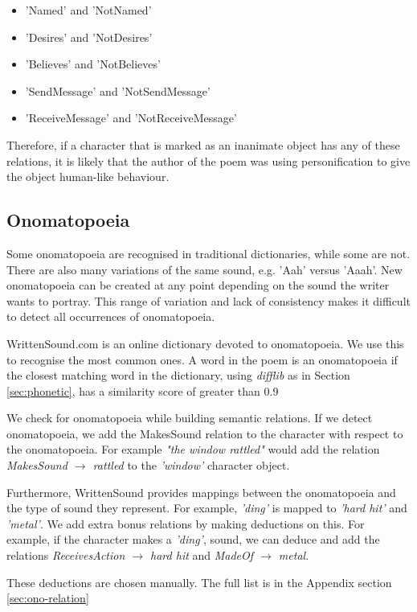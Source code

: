 \begin{itemize}
\item{'Named' and 'NotNamed'}
\item{'Desires' and 'NotDesires'}
\item{'Believes' and 'NotBelieves'}
\item{'SendMessage' and 'NotSendMessage'}
\item{'ReceiveMessage' and 'NotReceiveMessage'}
\end{itemize}

Therefore, if a character that is marked as an inanimate object has any of these relations, it is likely that the author of the poem was using personification to give the object human-like behaviour.


\subsection{Onomatopoeia}
\label{sec:ono}
Some onomatopoeia are recognised in traditional dictionaries, while some are not. There are also many variations of the same sound, e.g. 'Aah' versus 'Aaah'. New onomatopoeia can be created at any point depending on the sound the writer wants to portray. This range of variation and lack of consistency makes it difficult to detect all occurrences of onomatopoeia.

WrittenSound.com is an online dictionary devoted to onomatopoeia. We use this to recognise the most common ones. A word in the poem is an onomatopoeia if the closest matching word in the dictionary, using \textit{difflib} as in Section \ref{sec:phonetic}, has a similarity score of greater than 0.9

We check for onomatopoeia while building semantic relations. If we detect onomatopoeia, we add the MakesSound relation to the character with respect to the onomatopoeia. For example \textit{"the window rattled"} would add the relation \textit{MakesSound $\rightarrow$ rattled} to the \textit{'window'} character object.

Furthermore, WrittenSound provides mappings between the onomatopoeia and the type of sound they represent. For example, \textit{'ding'} is mapped to \textit{'hard hit'} and \textit{'metal'}. We add extra bonus relations by making deductions on this. For example, if the character makes a \textit{'ding'}, sound, we can deduce and add the relations \textit{ReceivesAction $\rightarrow$ hard hit} and \textit{MadeOf $\rightarrow$ metal}.

These deductions are chosen manually. The full list is in the Appendix section \ref{sec:ono-relation}


